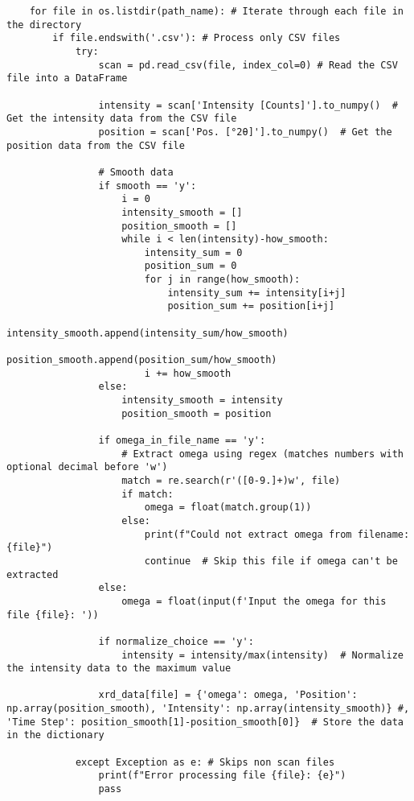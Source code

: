 \begin{small}
\begin{verbatim}
    for file in os.listdir(path_name): # Iterate through each file in the directory
        if file.endswith('.csv'): # Process only CSV files
            try:
                scan = pd.read_csv(file, index_col=0) # Read the CSV file into a DataFrame

                intensity = scan['Intensity [Counts]'].to_numpy()  # Get the intensity data from the CSV file
                position = scan['Pos. [°2θ]'].to_numpy()  # Get the position data from the CSV file

                # Smooth data                
                if smooth == 'y':
                    i = 0
                    intensity_smooth = []
                    position_smooth = []
                    while i < len(intensity)-how_smooth:
                        intensity_sum = 0
                        position_sum = 0
                        for j in range(how_smooth):
                            intensity_sum += intensity[i+j]
                            position_sum += position[i+j]
                        intensity_smooth.append(intensity_sum/how_smooth)
                        position_smooth.append(position_sum/how_smooth)
                        i += how_smooth
                else:
                    intensity_smooth = intensity
                    position_smooth = position
                
                if omega_in_file_name == 'y':
                    # Extract omega using regex (matches numbers with optional decimal before 'w')
                    match = re.search(r'([0-9.]+)w', file)
                    if match:
                        omega = float(match.group(1))
                    else:
                        print(f"Could not extract omega from filename: {file}")
                        continue  # Skip this file if omega can't be extracted
                else:
                    omega = float(input(f'Input the omega for this file {file}: '))
                
                if normalize_choice == 'y':
                    intensity = intensity/max(intensity)  # Normalize the intensity data to the maximum value

                xrd_data[file] = {'omega': omega, 'Position': np.array(position_smooth), 'Intensity': np.array(intensity_smooth)} #, 'Time Step': position_smooth[1]-position_smooth[0]}  # Store the data in the dictionary

            except Exception as e: # Skips non scan files
                print(f"Error processing file {file}: {e}")
                pass


\end{verbatim}
\end{small}
